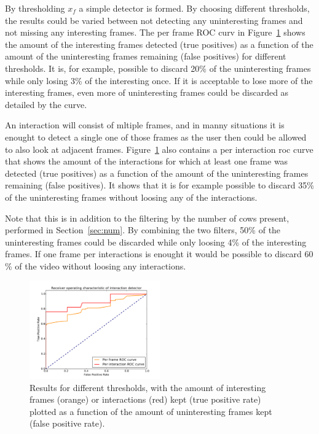 \documentclass{cta-author}
\begin{document}
By thresholding $x_f$ a simple detector is formed. By choosing different thresholds, the results could be varied between not detecting any uninteresting frames and not missing any interesting frames. The per frame ROC curv in Figure~\ref{fig:roc} shows the amount of the interesting frames detected (true positives) as a function of the amount of the uninteresting frames remaining (false positives) for different thresholds. It is, for example, possible to discard 20\% of the uninteresting frames while only losing 3\% of the interesting once. If it is acceptable to lose more of the interesting frames, even more of uninteresting frames could be discarded as detailed by the curve.

An interaction will consist of mltiple frames, and in manny situations it is enought to detect a single one of those frames as the user then could be allowed to also look at adjacent frames. Figure~\ref{fig:roc} also contains a per interaction roc curve that shows the amount of the interactions for which at least one frame was detected (true positives) as a function of the amount of the uninteresting frames remaining (false positives). It shows that it is for example possible to discard 35\% of the uninteresting frames without loosing any of the interactions.

Note that this is in addition to the filtering by the number of cows present, performed in Section~\ref{sec:num}. By combining the two filters, 50\% of the uninteresting frames could be discarded while only loosing 4\% of the interesting frames. If one frame per interactions is enought it would be possible to discard 60 \% of the video without loosing any interactions.

\begin{figure}[tb]
\begin{center}
  \includegraphics[width=0.5\textwidth]{roc.pdf}
\end{center}
  \caption{Results for different thresholds, with the amount of interesting frames (orange) or interactions (red) kept (true positive rate) plotted as a function of the amount of uninteresting frames kept (false positive rate).}
  \label{fig:roc}
\end{figure}
\end{document}
